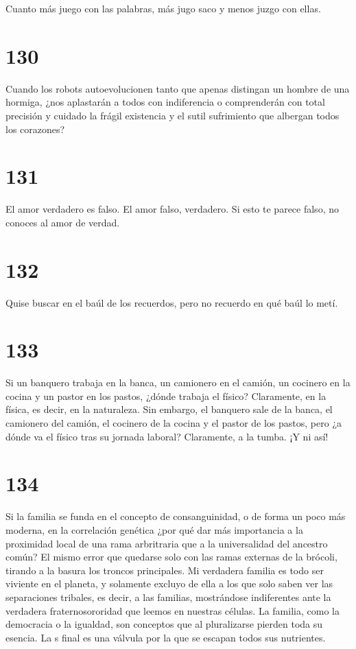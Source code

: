 \documentclass[a4paper,11pt,openright,twocolumn]{book}
\begin{document}
Cuanto más juego con las palabras, más jugo saco y menos juzgo con ellas.

\section*{130}

Cuando los robots autoevolucionen tanto que apenas distingan un hombre de una hormiga, ¿nos aplastarán a todos
con indiferencia o comprenderán con total precisión y cuidado la frágil existencia y el sutil sufrimiento
que albergan todos los corazones? 

\section*{131}

El amor verdadero es falso. El amor falso, verdadero. Si esto te parece falso, no conoces al amor
de verdad.

\section*{132}


Quise buscar en el baúl de los recuerdos, pero no recuerdo en qué baúl lo metí.

\section*{133}

Si un banquero trabaja en la banca, un camionero en el camión, un cocinero en la cocina y un pastor en
los pastos, ¿dónde trabaja el físico? Claramente, en la física, es decir, en la naturaleza. Sin embargo,
el banquero sale de la banca, el camionero del camión, el cocinero de la cocina y el pastor de los pastos,
pero ¿a dónde va el físico tras su jornada laboral? Claramente, a la tumba. ¡Y ni así!

\section*{134}

Si la familia se funda en el concepto de consanguinidad, o de forma un poco más moderna, en
la correlación genética ¿por qué dar más importancia a la
proximidad local de una rama arbritraria que a la universalidad del ancestro común? El mismo
error que quedarse solo con las ramas externas de la brócoli, tirando a la basura los troncos
principales. Mi verdadera
familia es todo ser viviente en el planeta, y solamente excluyo de ella a los que solo saben ver las separaciones
tribales, es decir, a las familias, mostrándose indiferentes ante la verdadera fraternosororidad
que leemos en nuestras células. La familia, como la democracia o la igualdad, son conceptos que al pluralizarse
pierden toda su esencia. La s final es una válvula por la que se escapan todos sus nutrientes.
\end{document}
